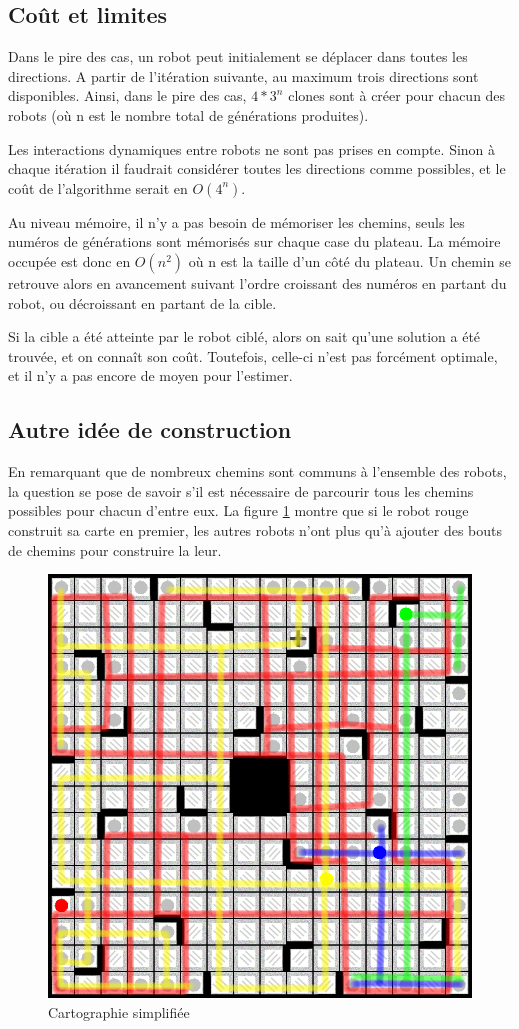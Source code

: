 \documentclass[a4paper,11pt]{article}
\begin{document}
\subsection{Co\^ut et limites}
Dans le pire des cas, un robot peut initialement se d\'eplacer dans toutes les directions. A partir de l'it\'eration suivante, au maximum trois directions sont disponibles. Ainsi, dans le pire des cas, $4*3^n$ clones sont \`a cr\'eer pour chacun des robots (o\`u n est le nombre total de g\'en\'erations produites).
\par Les interactions dynamiques entre robots ne sont pas prises en compte. Sinon \`a chaque it\'eration il faudrait consid\'erer toutes les directions comme possibles, et le co\^ut de l'algorithme serait en $O(4^n)$.
\par Au niveau m\'emoire, il n'y a pas besoin de m\'emoriser les chemins, seuls les num\'eros de g\'en\'erations sont m\'emoris\'es sur chaque case du plateau. La m\'emoire occup\'ee est donc en $O(n^2)$ o\`u n est la taille d'un c\^ot\'e du plateau. Un chemin se retrouve alors en avancement suivant l'ordre croissant des num\'eros en partant du robot, ou d\'ecroissant en partant de la cible.
\par Si la cible a \'et\'e atteinte par le robot cibl\'e, alors on sait qu'une solution a \'et\'e trouv\'ee, et on conna\^it son co\^ut. Toutefois, celle-ci n'est pas forc\'ement optimale, et il n'y a pas encore de moyen pour l'estimer.

\newpage
\subsection{Autre id\'ee de construction}
En remarquant que de nombreux chemins sont communs \`a l'ensemble des robots, la question se pose de savoir s'il est n\'ecessaire de parcourir tous les chemins possibles pour chacun d'entre eux. La figure \ref{fig:itineraire} montre que si le robot rouge construit sa carte en premier, les autres robots n'ont plus qu'\`a ajouter des bouts de chemins pour construire la leur.

\begin{figure}[htbp]
    \centering
    \includegraphics[width=.7\linewidth]{img/chemins_initiaux.png}
    \caption{Cartographie simplifi\'ee}
    \label{fig:itineraire}
  \end{figure}
\end{document}
